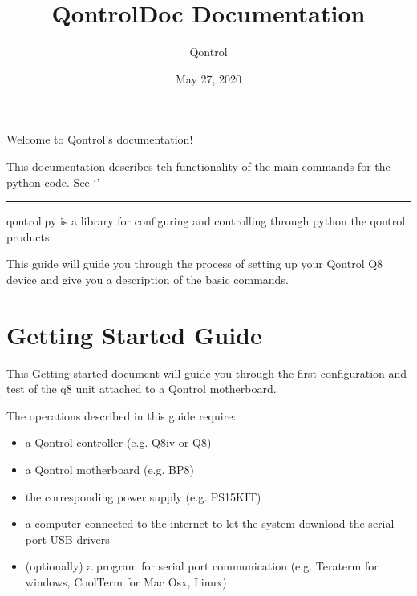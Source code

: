 \documentclass[letterpaper,10pt,english]{sphinxmanual}
\title{QontrolDoc Documentation}
\date{May 27, 2020}
\author{Qontrol}
\begin{document}
\maketitle
\sphinxtableofcontents
{}\label{\detokenize{index::doc}}
Welcome to Qontrol’s documentation!

This documentation describes teh functionality of the main commands for the python  code.
See ‘’


\bigskip\hrule\bigskip




qontrol.py is a library for configuring and controlling through python the qontrol products.

This guide will guide you through the process of setting up your Qontrol Q8 device and give you a description of the basic commands.


\chapter{Getting Started Guide}
\label{\detokenize{guide/getting_started::doc}}\label{\detokenize{guide/getting_started:intro}}\label{\detokenize{guide/getting_started:introduction}}\label{\detokenize{guide/getting_started:getting-started-guide}}
This Getting started document will guide you through the first configuration and test of the q8 unit
attached to a Qontrol motherboard.

The operations described in this guide require:
\begin{itemize}
\item {} 
a Qontrol controller (e.g. Q8iv or Q8)

\item {} 
a Qontrol motherboard (e.g. BP8)

\item {} 
the corresponding power supply (e.g. PS15KIT)

\item {} 
a computer connected to the internet to let the system download the serial port USB drivers

\item {} 
(optionally) a program for serial port communication (e.g. Teraterm for windows, CoolTerm for Mac Osx, Linux)

\end{itemize}
\end{document}
